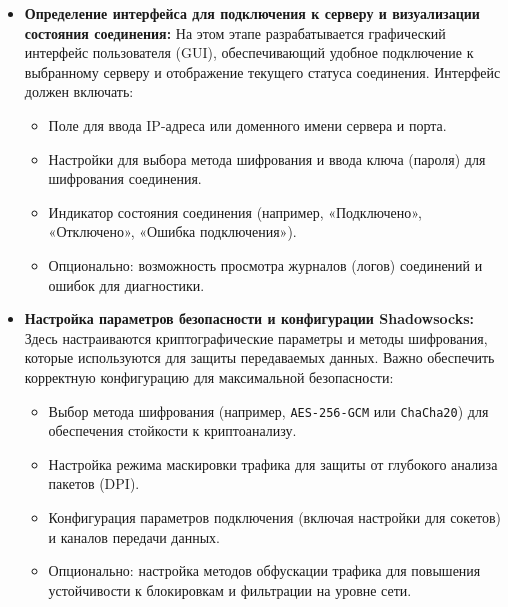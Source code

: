 \documentclass{SCWorks}
\begin{document}
\begin{itemize}
    \item \textbf{Определение интерфейса для подключения к серверу и визуализации состояния соединения:}  
    На этом этапе разрабатывается графический интерфейс пользователя (GUI), обеспечивающий удобное подключение к выбранному серверу и отображение текущего статуса соединения. Интерфейс должен включать:
    \begin{itemize}
        \item Поле для ввода IP-адреса или доменного имени сервера и порта.
        \item Настройки для выбора метода шифрования и ввода ключа (пароля) для шифрования соединения.
        \item Индикатор состояния соединения (например, «Подключено», «Отключено», «Ошибка подключения»).
        \item Опционально: возможность просмотра журналов (логов) соединений и ошибок для диагностики.
    \end{itemize}

    \item \textbf{Настройка параметров безопасности и конфигурации Shadowsocks:}  
    Здесь настраиваются криптографические параметры и методы шифрования, которые используются для защиты передаваемых данных. Важно обеспечить корректную конфигурацию для максимальной безопасности:
    \begin{itemize}
        \item Выбор метода шифрования (например, \texttt{AES-256-GCM} или \texttt{ChaCha20}) для обеспечения стойкости к криптоанализу.
        \item Настройка режима маскировки трафика для защиты от глубокого анализа пакетов (DPI).
        \item Конфигурация параметров подключения (включая настройки для сокетов) и каналов передачи данных.
        \item Опционально: настройка методов обфускации трафика для повышения устойчивости к блокировкам и фильтрации на уровне сети.
    \end{itemize}


\end{itemize}
\end{document}
